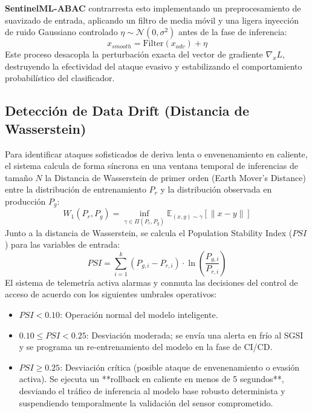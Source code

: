 \documentclass[12pt,letterpaper]{article}
\begin{document}
\textbf{SentinelML-ABAC} contrarresta esto implementando un preprocesamiento de suavizado de entrada, aplicando un filtro de media móvil y una ligera inyección de ruido Gaussiano controlado $\eta \sim \mathcal{N}(0, \sigma^2)$ antes de la fase de inferencia:
\begin{equation}
    x_{smooth} = \text{Filter}(x_{adv}) + \eta
\end{equation}
Este proceso desacopla la perturbación exacta del vector de gradiente $\nabla_x L$, destruyendo la efectividad del ataque evasivo y estabilizando el comportamiento probabilístico del clasificador.

\subsection{Detección de Data Drift (Distancia de Wasserstein)}
Para identificar ataques sofisticados de deriva lenta o envenenamiento en caliente, el sistema calcula de forma síncrona en una ventana temporal de inferencias de tamaño $N$ la Distancia de Wasserstein de primer orden (Earth Mover's Distance) entre la distribución de entrenamiento $P_r$ y la distribución observada en producción $P_g$:
\begin{equation}
    W_1(P_r, P_g) = \inf_{\gamma \in \Pi(P_r, P_g)} \mathbb{E}_{(x,y)\sim \gamma}[\|x - y\|]
\end{equation}
Junto a la distancia de Wasserstein, se calcula el Population Stability Index ($PSI$) para las variables de entrada:
\begin{equation}
    PSI = \sum_{i=1}^{k} \left( P_{g,i} - P_{r,i} \right) \cdot \ln\left( \frac{P_{g,i}}{P_{r,i}} \right)
\end{equation}
El sistema de telemetría activa alarmas y conmuta las decisiones del control de acceso de acuerdo con los siguientes umbrales operativos:
\begin{itemize}
    \item   \textbf{$PSI < 0.10$}: Operación normal del modelo inteligente.
    \item   \textbf{$0.10 \le PSI < 0.25$}: Desviación moderada; se envía una alerta en frío al SGSI y se programa un re-entrenamiento del modelo en la fase de CI/CD.
    \item   \textbf{$PSI \ge 0.25$}: Desviación crítica (posible ataque de envenenamiento o evasión activa). Se ejecuta un **rollback en caliente en menos de 5 segundos**, desviando el tráfico de inferencia al modelo base robusto determinista y suspendiendo temporalmente la validación del sensor comprometido.
\end{itemize}
\end{document}
